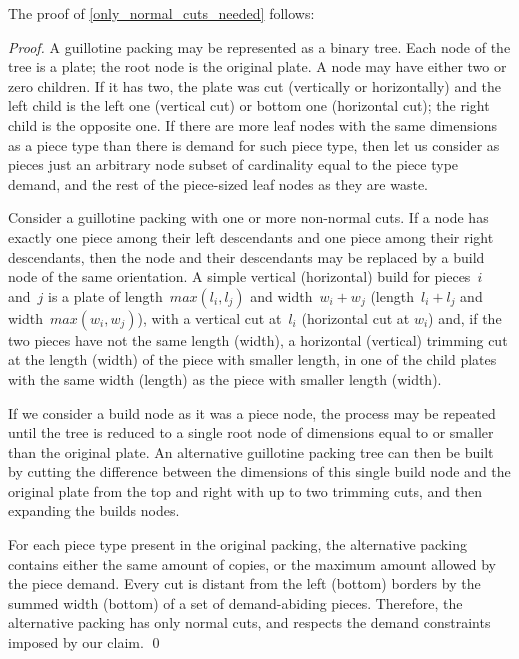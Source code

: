 \documentclass[runningheads]{llncs}
\begin{document}
The proof of \autoref{only_normal_cuts_needed} follows:
\begin{proof}
A guillotine packing may be represented as a binary tree.
Each node of the tree is a plate; the root node is the original plate.
A node may have either two or zero children. If it has two, the plate was cut (vertically or horizontally) and the left child is the left one (vertical cut) or bottom one (horizontal cut); the right child is the opposite one.
If there are more leaf nodes with the same dimensions as a piece type than there is demand for such piece type, then let us consider as pieces just an arbitrary node subset of cardinality equal to the piece type demand, and the rest of the piece-sized leaf nodes as they are waste.

Consider a guillotine packing with one or more non-normal cuts.
If a node has exactly one piece among their left descendants and one piece among their right descendants, then the node and their descendants may be replaced by a build node of the same orientation.
A simple vertical (horizontal) build for pieces~\(i\) and~\(j\) is a plate of length~\(max(l_i, l_j)\) and width~\(w_i + w_j\) (length~\(l_i + l_j\) and width~\(max(w_i, w_j)\)), with a vertical cut at~\(l_i\) (horizontal cut at \(w_i\)) and, if the two pieces have not the same length (width), a horizontal (vertical) trimming cut at the length (width) of the piece with smaller length, in one of the child plates with the same width (length) as the piece with smaller length (width).

If we consider a build node as it was a piece node, the process may be repeated until the tree is reduced to a single root node of dimensions equal to or smaller than the original plate.
An alternative guillotine packing tree can then be built by cutting the difference between the dimensions of this single build node and the original plate from the top and right with up to two trimming cuts, and then expanding the builds nodes.

For each piece type present in the original packing, the alternative packing contains either the same amount of copies, or the maximum amount allowed by the piece demand.
Every cut is distant from the left (bottom) borders by the summed width (bottom) of a set of demand-abiding pieces.
Therefore, the alternative packing has only normal cuts, and respects the demand constraints imposed by our claim. \qed


\end{proof}
\end{document}

